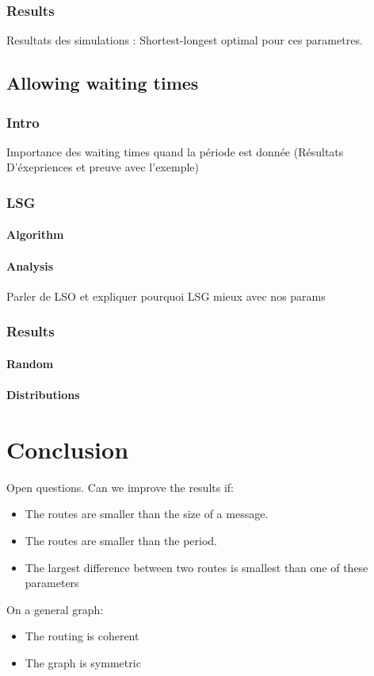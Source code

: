 \documentclass[a4paper,10pt]{article}
\begin{document}
    \subsubsection{Results}
      Resultats des simulations : Shortest-longest optimal pour ces parametres.
      
   \subsection{Allowing waiting times}
     \subsubsection{Intro}
	Importance des waiting times quand la période est donnée (Résultats D'éxepriences et preuve avec l'exemple)
     \subsubsection{LSG}
	\paragraph{Algorithm}
	\paragraph{Analysis}
	  Parler de LSO et expliquer pourquoi LSG mieux avec nos params
     \subsubsection{Results}
	 \paragraph{Random}
	 \paragraph{Distributions}
   
\section{Conclusion}


Open questions. Can we improve the results if:
\begin{itemize}
 \item The routes are smaller than the size of a message. 
\item The routes are smaller than the period.
\item The largest difference between two routes is smallest than one of these parameters
\end{itemize}

 On a general graph:
 
\begin{itemize}
\item The routing is coherent
 \item The graph is symmetric
\end{itemize}




\end{document}

